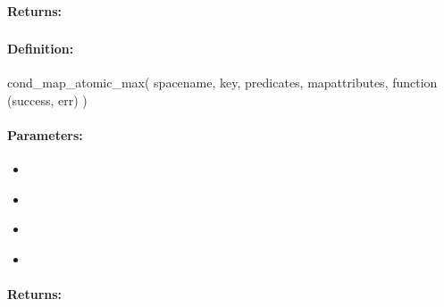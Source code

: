 \paragraph{Returns:}


\pagebreak
\subsubsection{}
\label{api:nodejs:cond_map_atomic_max}


\paragraph{Definition:}
\begin{javascriptcode}
cond_map_atomic_max(
        spacename, key, predicates, mapattributes, function (success, err) {})
\end{javascriptcode}
\paragraph{Parameters:}
\begin{itemize}[noitemsep]
\item {}\\

\item {}\\

\item {}\\

\item {}\\

\end{itemize}

\paragraph{Returns:}


\pagebreak
\subsubsection{}
\label{api:nodejs:group_map_atomic_max}


